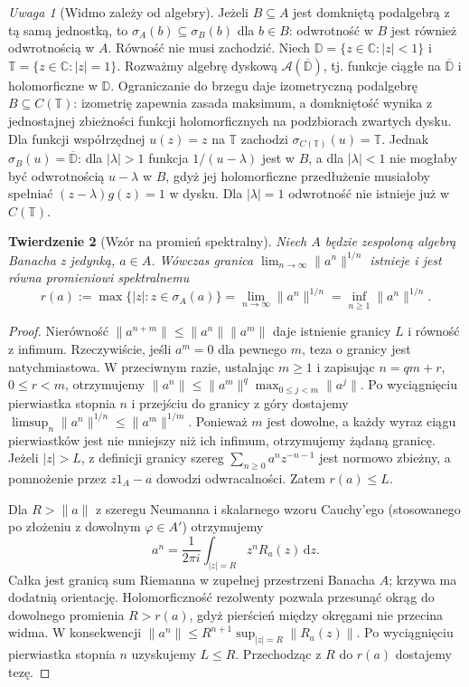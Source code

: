 \documentclass[11pt,a4paper]{article}
\numberwithin{equation}{section}
\theoremstyle{plain}
\newtheorem{twierdzenie}{Twierdzenie}[section]
\theoremstyle{definition}
\theoremstyle{remark}
\newtheorem{uwaga}[twierdzenie]{Uwaga}
\newcommand{\C}{\mathbb C}
\begin{document}
\begin{uwaga}[Widmo zależy od algebry]
Jeżeli $B\subseteq A$ jest domkniętą podalgebrą z tą samą jednostką,
to $\sigma_A(b)\subseteq\sigma_B(b)$ dla $b\in B$:
odwrotność w $B$ jest również odwrotnością w $A$.
Równość nie musi zachodzić. Niech
$\mathbb D=\{z\in\C:|z|<1\}$ i
$\mathbb T=\{z\in\C:|z|=1\}$.
Rozważmy algebrę dyskową
$\mathcal A(\overline{\mathbb D})$, tj. funkcje ciągłe
na $\overline{\mathbb D}$ i holomorficzne w $\mathbb D$.
Ograniczanie do brzegu daje izometryczną podalgebrę
$B\subseteq C(\mathbb T)$: izometrię zapewnia zasada maksimum,
a domkniętość wynika z jednostajnej zbieżności funkcji
holomorficznych na podzbiorach zwartych dysku.
Dla funkcji współrzędnej $u(z)=z$ na $\mathbb T$ zachodzi
$\sigma_{C(\mathbb T)}(u)=\mathbb T$.
Jednak $\sigma_B(u)=\overline{\mathbb D}$: dla
$|\lambda|>1$ funkcja $1/(u-\lambda)$ jest w $B$,
a dla $|\lambda|<1$ nie mogłaby być odwrotnością
$u-\lambda$ w $B$, gdyż jej holomorficzne przedłużenie
musiałoby spełniać $(z-\lambda)g(z)=1$ w dysku.
Dla $|\lambda|=1$ odwrotność nie istnieje już w
$C(\mathbb T)$.
\end{uwaga}

\begin{twierdzenie}[Wzór na promień spektralny]
\label{thm:spectral-radius31}
Niech $A$ będzie zespoloną algebrą Banacha z jedynką, $a\in A$.
Wówczas granica $\lim_{n\to\infty}\|a^n\|^{1/n}$ istnieje
i jest równa promieniowi spektralnemu
\[
 r(a):=\max\{|z|:z\in\sigma_A(a)\}
 =\lim_{n\to\infty}\|a^n\|^{1/n}
 =\inf_{n\ge1}\|a^n\|^{1/n}.
\]
\end{twierdzenie}
\begin{proof}
Nierówność $\|a^{n+m}\|\le\|a^n\|\|a^m\|$ daje istnienie granicy
$L$ i równość z infimum. Rzeczywiście, jeśli $a^m=0$ dla
pewnego $m$, teza o granicy jest natychmiastowa.
W przeciwnym razie, ustalając $m\ge1$ i zapisując $n=qm+r$,
$0\le r<m$, otrzymujemy
$\|a^n\|\le\|a^m\|^q\max_{0\le j<m}\|a^j\|$.
Po wyciągnięciu pierwiastka stopnia $n$ i przejściu do granicy
z góry dostajemy
$\limsup_n\|a^n\|^{1/n}\le\|a^m\|^{1/m}$.
Ponieważ $m$ jest dowolne, a każdy wyraz ciągu pierwiastków
jest nie mniejszy niż ich infimum, otrzymujemy żądaną granicę.
Jeżeli $|z|>L$, z definicji granicy szereg
$\sum_{n\ge0}a^n z^{-n-1}$ jest normowo zbieżny,
a pomnożenie przez $z1_A-a$ dowodzi odwracalności.
Zatem $r(a)\le L$.

Dla $R>\|a\|$ z szeregu Neumanna i skalarnego wzoru Cauchy'ego
(stosowanego po złożeniu z dowolnym $\varphi\in A'$) otrzymujemy
\[
 a^n=\frac{1}{2\pi i}\int_{|z|=R}z^nR_a(z)\,\mathrm dz.
\]
Całka jest granicą sum Riemanna w zupełnej przestrzeni Banacha $A$;
krzywa ma dodatnią orientację. Holomorficzność rezolwenty pozwala
przesunąć okrąg do dowolnego promienia $R>r(a)$, gdyż pierścień
między okręgami nie przecina widma. W konsekwencji
$\|a^n\|\le R^{n+1}\sup_{|z|=R}\|R_a(z)\|$.
Po wyciągnięciu pierwiastka stopnia $n$ uzyskujemy $L\le R$.
Przechodząc z $R$ do $r(a)$ dostajemy tezę.
\end{proof}
\end{document}
